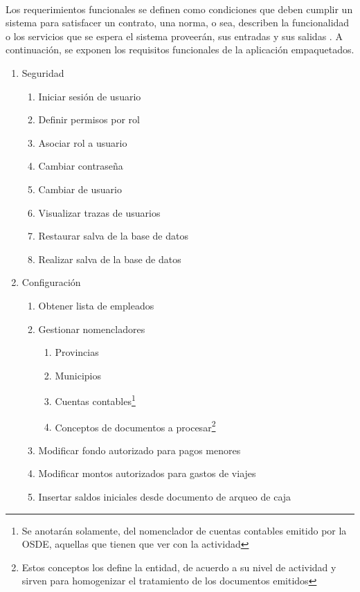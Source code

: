 \paragraph{}Los requerimientos funcionales se definen como condiciones que deben cumplir un sistema para satisfacer un contrato, una norma, o sea, describen la funcionalidad o los servicios que se espera el sistema proveerán, sus entradas y sus salidas \cite{miranda_aplicaciones_2018}. A continuación, se exponen los requisitos funcionales de la aplicación empaquetados.
\begin{enumerate}
	\item Seguridad
	\begin{enumerate}
		\item Iniciar sesión de usuario
		\item Definir permisos por rol
		\item Asociar rol a usuario
		\item Cambiar contraseña
		\item Cambiar de usuario
		\item Visualizar trazas de usuarios
		\item Restaurar salva de la base de datos
		\item Realizar salva de la base de datos
	\end{enumerate}
	\item Configuración
	\begin{enumerate}
		\item Obtener lista de empleados
		\item Gestionar nomencladores
		\begin{enumerate}
			\item Provincias
			\item Municipios
			\item Cuentas contables\footnote{Se anotarán solamente, del nomenclador de cuentas contables emitido por la OSDE, aquellas que tienen que ver 	con la actividad}
			\item Conceptos de documentos a procesar\footnote{Estos conceptos los define la entidad, de acuerdo a su nivel de actividad y sirven para 	homogenizar el tratamiento de los documentos emitidos}
		\end{enumerate}
		\item Modificar fondo autorizado para pagos menores
		\item Modificar montos autorizados para gastos de viajes
		\item Insertar saldos iniciales desde documento de arqueo de caja

\end{enumerate}
\end{enumerate}
